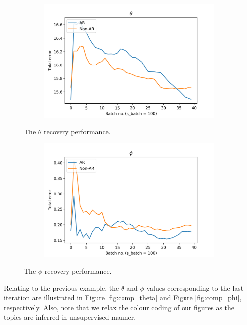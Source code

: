 \documentclass{mpaper}
\begin{document}
\begin{figure}[h]
  \centering
  \begin{subfigure}[b]{0.37\textwidth}
    \includegraphics[width=\linewidth]{performance-theta.png}
  \end{subfigure}%
  \caption{The $\theta$ recovery performance.}
  \label{fig:perf_theta}
  \begin{subfigure}[b]{0.37\textwidth}
    \includegraphics[width=\linewidth]{performance-phi.png}
  \end{subfigure}%
  \caption{The $\phi$ recovery performance.}
  \label{fig:perf_phi}
\end{figure}

\par Relating to the previous example, the $\theta$ and $\phi$ values corresponding to the last iteration are illustrated in Figure \ref{fig:comp_theta} and Figure \ref{fig:comp_phi}, respectively. Also, note that we relax the colour coding of our figures as the topics are inferred in unsupervised manner.
\end{document}
